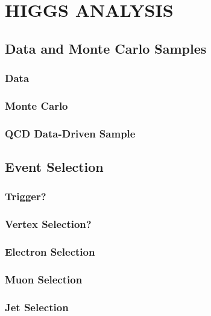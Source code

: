 %
%
%



\chapter{\uppercase {Higgs Analysis}}

\section{Data and Monte Carlo Samples}
\subsection{Data}
\subsection{Monte Carlo}
\subsection{QCD Data-Driven Sample}

\section{Event Selection}
\subsection{Trigger?}
\subsection{Vertex Selection?}
\subsection{Electron Selection}
\subsection{Muon Selection}
\subsection{Jet Selection}
